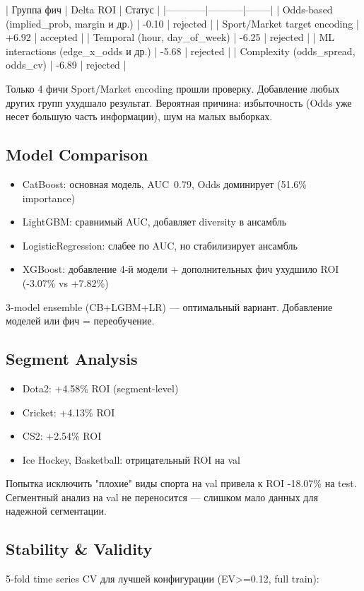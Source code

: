\documentclass[12pt,a4paper]{article}
\begin{document}
| Группа фич | Delta ROI | Статус |
|------------|-----------|--------|
| Odds-based (implied\_prob, margin и др.) | -0.10 | rejected |
| Sport/Market target encoding | +6.92 | accepted |
| Temporal (hour, day\_of\_week) | -6.25 | rejected |
| ML interactions (edge\_x\_odds и др.) | -5.68 | rejected |
| Complexity (odds\_spread, odds\_cv) | -6.89 | rejected |

Только 4 фичи Sport/Market encoding прошли проверку. Добавление любых других групп ухудшало результат. Вероятная причина: избыточность (Odds уже несет большую часть информации), шум на малых выборках.

\subsection{Model Comparison}
\begin{itemize}
  \item CatBoost: основная модель, AUC~0.79, Odds доминирует (51.6\% importance)
  \item LightGBM: сравнимый AUC, добавляет diversity в ансамбль
  \item LogisticRegression: слабее по AUC, но стабилизирует ансамбль
  \item XGBoost: добавление 4-й модели + дополнительных фич ухудшило ROI (-3.07\% vs +7.82\%)
\end{itemize}

3-model ensemble (CB+LGBM+LR) — оптимальный вариант. Добавление моделей или фич = переобучение.

\subsection{Segment Analysis}
\begin{itemize}
  \item Dota2: +4.58\% ROI (segment-level)
  \item Cricket: +4.13\% ROI
  \item CS2: +2.54\% ROI
  \item Ice Hockey, Basketball: отрицательный ROI на val
\end{itemize}

Попытка исключить "плохие" виды спорта на val привела к ROI -18.07\% на test. Сегментный анализ на val не переносится — слишком мало данных для надежной сегментации.

\subsection{Stability \& Validity}
5-fold time series CV для лучшей конфигурации (EV>=0.12, full train):
\end{document}
